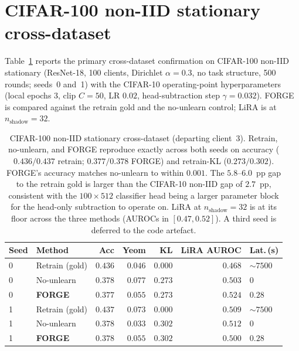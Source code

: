 \section{CIFAR-100 non-IID stationary cross-dataset}
\label{app:cifar100-noniid}

Table~\ref{tab:cifar100-noniid} reports the primary cross-dataset confirmation on
CIFAR-100 non-IID stationary (ResNet-18, 100 clients, Dirichlet $\alpha{=}0.3$,
no task structure, 500 rounds; seeds~0 and~1) with the CIFAR-10 operating-point
hyperparameters (local epochs 3, clip $C{=}50$, LR $0.02$, head-subtraction step
$\gamma{=}0.032$). FORGE is compared against the retrain gold and the no-unlearn
control; LiRA is at $n_\mathrm{shadow}{=}32$.

\begin{table}[h]
\centering
\scriptsize
\setlength{\tabcolsep}{3pt}
\begin{tabular}{llrrrrl}
\toprule
Seed & Method & Acc & Yeom & KL & LiRA AUROC & Lat.\,(s) \\
\midrule
0 & Retrain (gold)   & $0.436$ & $0.046$ & $0.000$ & $0.468$ & $\sim 7500$ \\
0 & No-unlearn       & $0.378$ & $0.077$ & $0.273$ & $0.503$ & $0$ \\
0 & \textbf{FORGE}   & $\mathbf{0.377}$ & $\mathbf{0.055}$ & $\mathbf{0.273}$ & $\mathbf{0.524}$ & $\mathbf{0.28}$ \\
\midrule
1 & Retrain (gold)   & $0.437$ & $0.073$ & $0.000$ & $0.509$ & $\sim 7500$ \\
1 & No-unlearn       & $0.378$ & $0.033$ & $0.302$ & $0.512$ & $0$ \\
1 & \textbf{FORGE}   & $\mathbf{0.378}$ & $\mathbf{0.055}$ & $\mathbf{0.302}$ & $\mathbf{0.500}$ & $\mathbf{0.28}$ \\
\bottomrule
\end{tabular}
\caption{CIFAR-100 non-IID stationary cross-dataset (departing client~$3$).
Retrain, no-unlearn, and FORGE reproduce exactly across both seeds on accuracy
($0.436/0.437$ retrain; $0.377/0.378$ FORGE) and retrain-KL
($0.273/0.302$). FORGE's accuracy matches no-unlearn to within $0.001$. The
$5.8$--$6.0$~pp gap to the retrain gold is larger than the CIFAR-10 non-IID
gap of $2.7$~pp, consistent with the $100\times 512$ classifier head being a
larger parameter block for the head-only subtraction to operate on. LiRA at
$n_\mathrm{shadow}{=}32$ is at its floor across the three methods (AUROCs in
$[0.47, 0.52]$). A third seed is deferred to the code artefact.}
\label{tab:cifar100-noniid}
\end{table}
